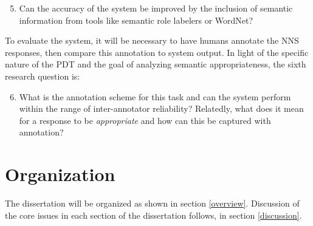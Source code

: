 \begin{enumerate}\setcounter{enumi}{4}
\item{Can the accuracy of the system be improved by the inclusion of semantic information from tools like semantic role labelers or WordNet?}
\end{enumerate}
To evaluate the system, it will be necessary to have humans annotate the NNS responses, then compare this annotation to system output. In light of the specific nature of the PDT and the goal of analyzing semantic appropriateness, the sixth research question is:

\begin{enumerate}\setcounter{enumi}{5}
\item{What is the annotation scheme for this task and can the system perform within the range of inter-annotator reliability? Relatedly, what does it mean for a response to be \textit{appropriate} and how can this be captured with annotation?}
\end{enumerate}

\section{Organization}
The dissertation will be organized as shown in section \ref{overview}. Discussion of the core issues in each section of the dissertation follows, in section \ref{discussion}.

